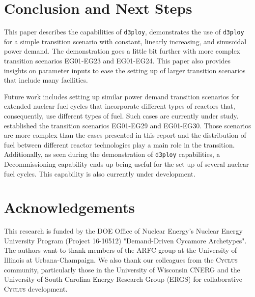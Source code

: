 \documentclass[11pt,letterpaper]{article}
\newcommand{\Cyclus}{\textsc{Cyclus}\xspace}%
\newcommand{\deploy}{\texttt{d3ploy}\xspace}%
\begin{document}
\section{Conclusion and Next Steps}
This paper describes the capabilities of \deploy, demonstrates 
the use of \deploy for a simple transition scenario with 
constant, linearly increasing, and sinusoidal power demand.
The demonstration goes a little bit further with more complex transition
scenarios EG01-EG23 and EG01-EG24. This paper also provides insights on
parameter inputs to ease the setting up of larger transition scenarios
that include many facilities.

Future work includes setting up similar power demand transition 
scenarios for extended nuclear fuel cycles that incorporate different types of
reactors that, consequently, use different types of fuel. Such cases are 
currently under study. \cite{wigeland_nuclear_2014} established the transition
scenarios EG01-EG29 and EG01-EG30. Those scenarios are more complex than the
cases presented in this report and the distribution of fuel between different
reactor technologies play a main role in the transition.
Additionally, as seen during the demonstration of \deploy capabilities, a Decommissioning capability ends up being useful for the set up of several nuclear fuel cycles. This capability is also currently under development.

\section{Acknowledgements}
This research is funded by the \gls{DOE} Office of 
Nuclear Energy's Nuclear Energy University Program (Project 16-10512) 
"Demand-Driven Cycamore Archetypes". The authors want to thank 
members of the \gls{ARFC} group at the University of Illinois at 
Urbana-Champaign. 
We also thank our colleagues from the \Cyclus community, 
particularly those in the University of Wisconsin 
\gls{CNERG} and the University of South Carolina Energy Research 
Group (ERGS) for collaborative \Cyclus development.

\pagebreak 


\end{document}
